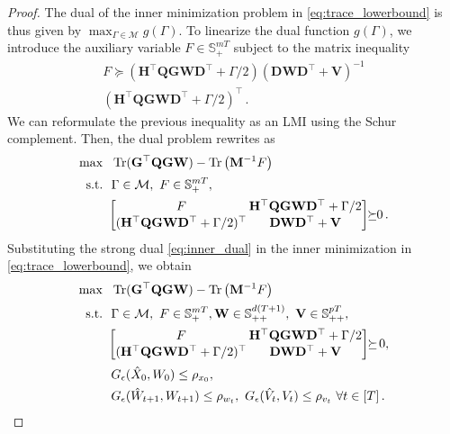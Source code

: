 \documentclass[10pt,a4paper]{amsart}
\DeclareMathOperator{\Tr}{Tr}
\begin{document}
\begin{proof}
\noindent
The dual of the inner minimization problem in \eqref{eq:trace_lowerbound} is thus given by 
$\max_{\Gamma \in \mathcal{M}} g(\Gamma)$.
To linearize the dual function $g(\Gamma)$, we introduce the auxiliary variable $F \in \mathbb{S}_{+}^{mT}$ 
subject to the matrix inequality
\[
\begin{multlined}
F \succeq 
  (\mathbf{H^{\top} Q G W D^{\top}} + \Gamma/2)
    (\mathbf{D W D^{\top} + V})^{-1}
    \\
    (\mathbf{H^{\top} Q G W D^{\top}} + \Gamma/2)^{\top}\,.
\end{multlined}
\]
We can reformulate the previous inequality as an LMI using the Schur complement. Then, the dual problem rewrites as
\begin{equation}
\label{eq:inner_dual}
\begin{aligned}
\max \ \ &\Tr(\mathbf{G^{\top} Q G W}) - 
\Tr\big(\mathbf{M}^{-1} F\big)
\\[1pt]
\text{s.t.} \ \ & 
\Gamma \in \mathcal{M}, \ 
F \in \mathbb{S}_{+}^{mT},
\\[1pt]
& 
\!\!\setlength\arraycolsep{.9pt}
\begin{bmatrix}
F & \mathbf{H^{\top} Q G W D^{\top}} + \Gamma/2
\\[1pt]
(\mathbf{H^{\top} Q G W D^{\top}} + \Gamma/2)^{\top} & \mathbf{D W D^{\top} + V}
\end{bmatrix}
\!\!\succeq\!\!0\,.
\end{aligned}
\end{equation}
Substituting the strong dual \eqref{eq:inner_dual} in the inner minimization in \eqref{eq:trace_lowerbound}, we obtain
\begin{align*}
  \max \ \ &\Tr(\mathbf{G^{\top} Q G W}) - 
\Tr\big(\mathbf{M}^{-1} F\big)
\\[1pt]
\text{s.t.} \ \ & 
\Gamma \in \mathcal{M}, \ 
F \in \mathbb{S}_{+}^{mT},\mathbf{W} \in \mathbb{S}_{++}^{d(T+1)}, \ 
\mathbf{V} \in \mathbb{S}_{++}^{pT},
\\[1pt]
& 
\!\!\setlength\arraycolsep{.9pt}
\begin{bmatrix}
F & \mathbf{H^{\top} Q G W D^{\top}} + \Gamma/2
\\[1pt]
(\mathbf{H^{\top} Q G W D^{\top}} + \Gamma/2)^{\top} & \mathbf{D W D^{\top} + V}
\end{bmatrix}
\!\!\succeq\! 0,
\\[1pt]
&G_\epsilon(\hat{X}_0, W_0) \leq \rho_{x_0},
\\
&G_\epsilon(\hat{W}_{t+1}, W_{t+1}) \leq \rho_{w_t},\ G_\epsilon(\hat{V}_t, V_t) \leq \rho_{v_t} \ \forall t \in [T]\,.

\end{align*}
\end{proof}
\end{document}
